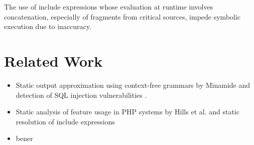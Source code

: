 \documentclass[preprint]{sig-alternate-05-2015}
\begin{document}
\begin{framed}
\textcolor{RYB1}{The use of include expressions whose evaluation at runtime
involves concatenation, especially of fragments from critical sources, impede
symbolic execution due to inaccuracy.}
\end{framed}





\section{Related Work}
\begin{itemize}
  \item Static output approximation using context-free grammars
  by Minamide \cite{minamide2005static} and detection of SQL
  injection vulnerabilities \cite{wassermann2007sound}.
  \item Static analysis of feature usage in PHP systems by Hills et al.
  \cite{Hills:2013:ESP:2483760.2483786} and static resolution of include
  expressions \cite{Hills:2013:ESP:2483760.2483786,hills2014static}
  \item bener \cite{King1976} \cite{multiSE}
\end{itemize}










\newpage

%
%
\end{document}
